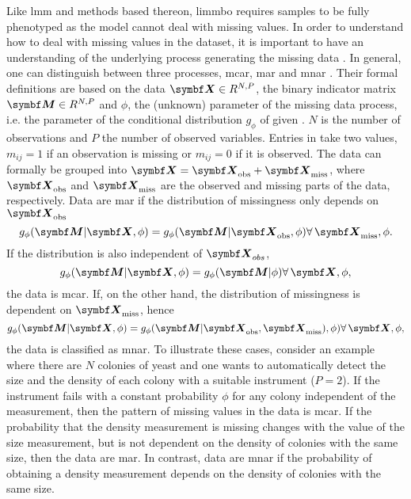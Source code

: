 Like \gls{lmm} and methods based thereon, \gls{limmbo} requires samples to be fully phenotyped as the model cannot deal with missing values. In order to understand how to deal with missing values in the dataset, it is important to have an understanding of the underlying process generating the missing data \citep{Rubin1976}. In general, one can distinguish between three processes, \gls{mcar}, \gls{mar} and \gls{mnar} \citep{Little2002}. Their formal definitions are based on the data \(\mat{X}  \in R^{N,P}\),  the binary indicator matrix \(\mat{M}  \in R^{N,P}\)  and \(\phi\), the (unknown) parameter of the missing data process, i.e. the parameter of the conditional distribution \(g_\phi\) of  given . \(N\) is the number of observations and \(P\) the number of observed variables. Entries in  take two values,  \(m_{ij} = 1 \) if an observation is missing or  \(m_{ij} = 0\) if it is observed. The data  can formally be grouped into \(\mat{X}=\mat{X}_\text{obs} + \mat{X}_\text{miss}\), where \(\mat{X}_\text{obs}\) and  \(\mat{X}_\text{miss}\) are the observed and missing parts of the data, respectively. Data are \gls{mar} if the distribution of missingness only depends on \(\mat{X}_{\text{obs}}\)
\begin{equation}
g_\phi(\mat{M} | \mat{X}, \phi) =  g_\phi(\mat{M} | \mat{X}_{\text{obs}}, \phi)  \forall \, \mat{X}_\text{miss}, \phi.
\end{equation}
If the distribution is also independent of \(\mat{X}_{obs}\), 
\begin{equation}
g_\phi(\mat{M} | \mat{X}, \phi) =  g_\phi(\mat{M} | \phi) \forall \, \mat{X}, \phi,
\end{equation}
the data is \gls{mcar}. If, on the other hand, the distribution of missingness is dependent on \(\mat{X}_{\text{miss}}\), hence
\begin{equation}
g_\phi(\mat{M} | \mat{X}, \phi) =  g_\phi(\mat{M} | \mat{X}_{\text{obs}}, \mat{X}_{\text{miss}}),\phi) \forall \, \mat{X}, \phi,
\end{equation}
the data is classified as \gls{mnar}. To illustrate these cases, consider an example where there are \(N\) colonies of yeast and one wants to automatically detect the size and the density of each colony with a suitable instrument (\(P=2\)). If the instrument fails with a constant probability \(\phi\) for any colony independent of the measurement, then the pattern of missing values in the data is \gls{mcar}. If the probability that the density measurement is missing changes with the value of the size measurement, but is not dependent on the density of colonies with the same size, then the data are \gls{mar}. In contrast, data are \gls{mnar} if the probability of obtaining a density measurement depends on the density of colonies with the same size. 


